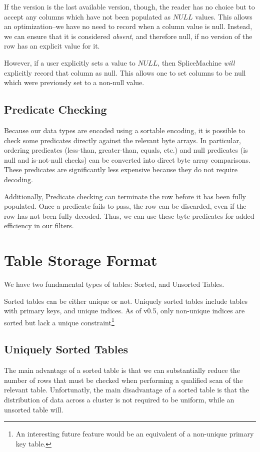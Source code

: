 If the version is the last available version, though, the reader has no choice but to accept any columns which have not been populated as $NULL$ values. This allows an optimization--we have no need to record when a column value is null. Instead, we can ensure that it is considered \emph{absent}, and therefore null, if no version of the row has an explicit value for it.

However, if a user explicitly sets a value to $NULL$, then SpliceMachine \emph{will} explicitly record that column as null. This allows one to set columns to be null which were previously set to a non-null value.

\subsection{Predicate Checking}
Because our data types are encoded using a sortable encoding, it is possible to check some predicates directly against the relevant byte arrays. In particular, ordering predicates (less-than, greater-than, equals, etc.) and null predicates (is null and is-not-null checks) can be converted into direct byte array comparisons. These predicates are significantly less expensive because they do not require decoding.

Additionally, Predicate checking can terminate the row before it has been fully populated. Once a predicate fails to pass, the row can be discarded, even if the row has not been fully decoded. Thus, we can use these byte predicates for added efficiency in our filters.

\section{Table Storage Format}
We have two fundamental types of tables: Sorted, and Unsorted Tables. 

Sorted tables can be either unique or not. Uniquely sorted tables include tables with primary keys, and unique indices. As of v0.5, only non-unique indices are sorted but lack a unique constraint\footnote{An interesting future feature would be an equivalent of a non-unique primary key table.}

\subsection{Uniquely Sorted Tables}
The main advantage of a sorted table is that we can substantially reduce the number of rows that must be checked when performing a qualified scan of the relevant table. Unfortunatly, the main disadvantage of a sorted table is that the distribution of data across a cluster is not required to be uniform, while an unsorted table will.


